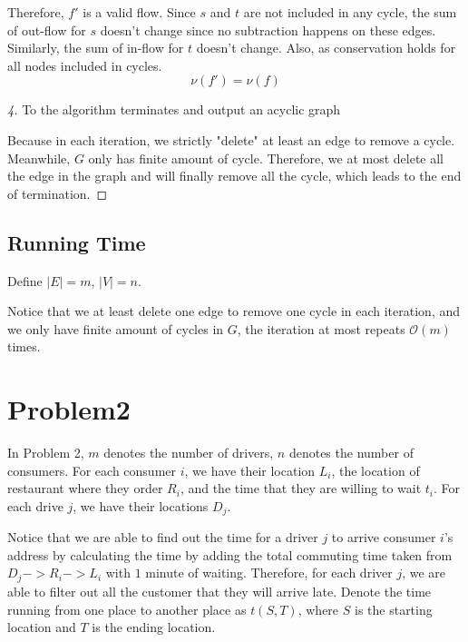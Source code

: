 \documentclass[openany]{article}
\begin{document}
Therefore, $f'$ is a valid flow. Since $s$ and $t$ are not included in any cycle, the sum of out-flow for $s$ doesn't change since no subtraction happens on these edges. Similarly, the sum of in-flow for $t$ doesn't change. Also, as conservation holds for all nodes included in cycles.
\[\nu(f') = \nu(f)\]

\begin{proof}[4]{To the algorithm terminates and output an acyclic graph}

Because in each iteration, we strictly "delete" at least an edge to remove a cycle. Meanwhile, $G$ only has finite amount of cycle. Therefore, we at most delete all the edge in the graph and will finally remove all the cycle, which leads to the end of termination.
    
\end{proof}

\subsection*{Running Time}
Define $|E| = m$, $|V| = n$.

Notice that we at least delete one edge to remove one cycle in each iteration, and we only have finite amount of cycles in $G$, the iteration at most repeats $\mathcal{O}(m)$ times. 

\section*{Problem2}
In Problem 2, $m$ denotes the number of drivers, $n$ denotes the number of consumers. For each consumer $i$, we have their location $L_i$, the location of restaurant where they order $R_i$, and the time that they are willing to wait $t_i$. For each drive $j$, we have their locations $D_j$.

Notice that we are able to find out the time for a driver $j$ to arrive consumer $i$'s address by calculating the time by adding the total commuting time taken from $D_j -> R_i -> L_i $ with $1$ minute of waiting. Therefore, for each driver $j$, we are able to filter out all the customer that they will arrive late. Denote the time running from one place to another place as $t(S,T)$, where $S$ is the starting location and $T$ is the ending location.
\end{document}
